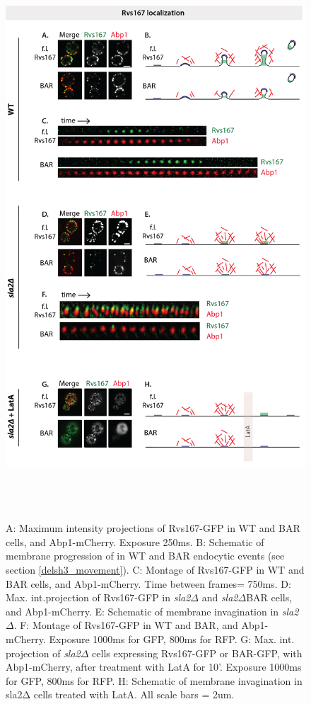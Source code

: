  
	\begin{figure}
	\centering
	\includegraphics[width=21cm,height=21cm,keepaspectratio]{figures/results_final/sla2_del_final7}
	\caption [Localization of Rvs167 and BAR with and without membrane curvature]
{A: Maximum intensity projections of Rvs167-GFP in WT and BAR cells, and Abp1-mCherry. Exposure 250ms. B: Schematic of membrane progression of in WT and BAR endocytic events (see section \ref{delsh3_movement}).
C: Montage of Rvs167-GFP in WT and BAR cells, and Abp1-mCherry. Time between frames= 750ms.
D: Max. int.projection of Rvs167-GFP in \textit{sla2$\Delta$} and \textit{sla2$\Delta$}BAR cells, and Abp1-mCherry. 
E: Schematic of membrane invagination in  \textit{sla2$\Delta$}. F: Montage of Rvs167-GFP in WT and BAR, and Abp1-mCherry. Exposure 1000ms for GFP, 800ms for RFP. 
G: Max. int. projection of \textit{sla2$\Delta$} cells expressing Rvs167-GFP or BAR-GFP, with Abp1-mCherry, after treatment with LatA for 10’. Exposure 1000ms for GFP, 800ms for RFP. H: Schematic of membrane invagination in sla2Δ cells treated with LatA. 
All scale bars = 2um.
	\label{fig2_sla2del}}
	\end{figure}



